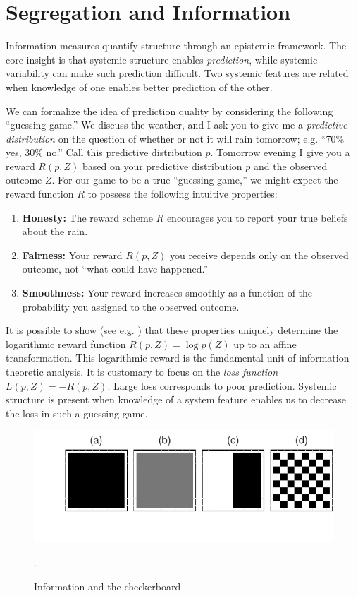 \documentclass[english]{scrartcl}
\begin{document}
\section{Segregation and Information} \label{sec:information}
	Information measures quantify structure through an epistemic framework. The core insight is that systemic structure enables \emph{prediction}, while systemic variability can make such prediction difficult. Two systemic features are related when knowledge of one enables better prediction of the other. 

	We can formalize the idea of prediction quality by considering the following ``guessing game.'' We discuss the weather, and I ask you to give me a \emph{predictive distribution} on the question of whether or not it will rain tomorrow; e.g. ``70\% yes, 30\% no.'' Call this predictive distribution $p$. Tomorrow evening I give you a reward $R(p,Z)$ based on your predictive distribution $p$ and the observed outcome $Z$. For our game to be a true ``guessing game,'' we might expect the reward function $R$ to possess the following intuitive properties: 
	\begin{enumerate}
		\item \textbf{Honesty:} The reward scheme $R$ encourages you to report your true beliefs about the rain.
		\item \textbf{Fairness:} Your reward $R(p,Z)$ you receive depends only on the observed outcome, not ``what could have happened.''
		\item \textbf{Smoothness:} Your reward increases smoothly as a function of the probability you assigned to the observed outcome. 
	\end{enumerate}
	It is possible to show (see e.g. \cite{Cover1991}) that these properties uniquely determine the logarithmic reward function $R(p,Z) = \log p(Z)$ up to an affine transformation. This logarithmic reward is the fundamental unit of information-theoretic analysis. It is customary to focus on the \emph{loss function} $L(p,Z) = - R(p,Z)$. Large loss corresponds to poor prediction. Systemic structure is present when knowledge of a system feature enables us to decrease the loss in such a guessing game. 

	\begin{figure}
		\includegraphics[width=\textwidth]{figs/checkerboard.pdf}
		\caption{Information and the checkerboard}. \label{fig:checkerboard}
	\end{figure}
\end{document}
